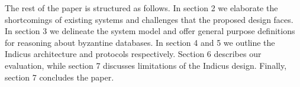 The rest of the paper is structured as follows. In section 2 we elaborate the shortcomings of existing systems and challenges that the proposed design faces. In section 3 we delineate the system model and offer general purpose definitions for reasoning about byzantine databases. In section 4 and 5 we outline the Indicus architecture and protocols respectively. Section 6 describes our evaluation, while section 7 discusses limitations of the Indicus design. Finally, section 7 concludes the paper. 
